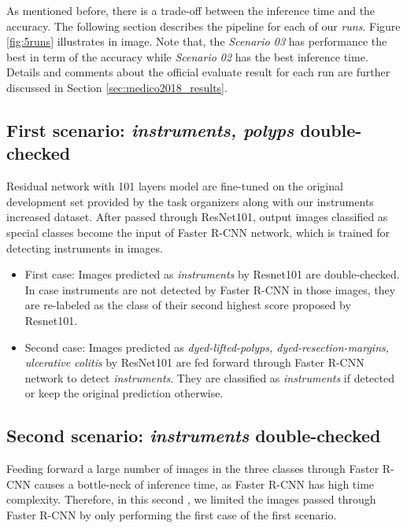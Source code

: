 As mentioned before, there is a trade-off between the inference time and the accuracy. 
The following section describes the pipeline for each of our \textit{runs}. Figure \ref{fig:5runs} illustrates in image. Note that, the \textit{Scenario 03} has performance the best in term of the accuracy while \textit{Scenario 02} has the best inference time. Details and comments about the official evaluate result for each run are further discussed in Section \ref{sec:medico2018_results}.

\subsection{First scenario: \textit{instruments, polyps} double-checked}
Residual network with 101 layers model are fine-tuned on the original development set provided by the task organizers along with our instruments increased dataset. After passed through ResNet101, output images classified as special classes become the input of Faster R-CNN network, which is trained for detecting instruments in images.

\begin{itemize}
    \item First case: Images predicted as \textit{instruments} by Resnet101 are double-checked. In case instruments are not detected by Faster R-CNN in those images, they are re-labeled as the class of their second highest score proposed by Resnet101. %
    \item Second case: Images predicted as \textit{dyed-lifted-polyps, dyed-resection-margins, ulcerative colitis} by ResNet101 are fed forward through Faster R-CNN network to detect \textit{instruments}. They are classified as \textit{instruments} if detected or keep the original prediction otherwise.
\end{itemize}

\subsection{Second scenario: \textit{instruments} double-checked}
Feeding forward a large number of images in the three classes through Faster R-CNN causes a bottle-neck of inference time, as Faster R-CNN has high time complexity.
Therefore, in this second , we limited the images passed through Faster R-CNN by only performing the first case of the first scenario.

